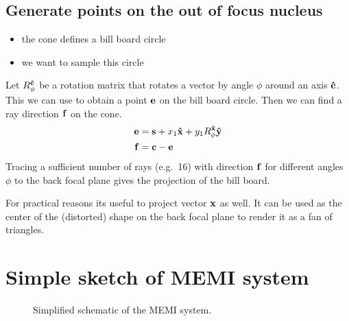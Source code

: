 \subsection{Generate points on the out of focus nucleus}
\begin{itemize}
\item the cone defines a bill board circle
\item we want to sample this circle
\end{itemize}
Let $R_\phi^{\mathbf{\hat{c}}}$ be a rotation matrix that rotates a vector by angle
$\phi$ around an axis $\mathbf{\hat{c}}$. This we can use to obtain a point $\mathbf{e}$
on the bill board circle. Then we can find a ray direction $\mathbf{f}$ on the
cone.
\begin{align}
  \mathbf{e}&=\mathbf{s}+x_1\mathbf{\hat{x}}+y_1R_\phi^{\mathbf{\hat{x}}}\mathbf{\hat{y}}\\
  \mathbf{f}&=\mathbf{c}-\mathbf{e}
\end{align}
Tracing a sufficient number of rays (e.g.\ 16) with direction $\mathbf{f}$ for
different angles $\phi$ to the back focal plane gives the projection
of the bill board.

For practical reasons its useful to project vector $\mathbf{x}$ as well. It
can be used as the center of the (distorted) shape on the back focal
plane to render it as a fan of triangles.


\section{Simple sketch of MEMI system}
\begin{figure}[!hbt]
  \centering
  
  \caption{Simplified schematic of the MEMI system.}
\end{figure}

